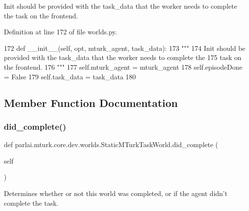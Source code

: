 \begin{DoxyVerb}Init should be provided with the task_data that the worker needs to complete the
task on the frontend.
\end{DoxyVerb}
 

Definition at line 172 of file worlds.\+py.


\begin{DoxyCode}
172     \textcolor{keyword}{def }\_\_init\_\_(self, opt, mturk\_agent, task\_data):
173         \textcolor{stringliteral}{"""}
174 \textcolor{stringliteral}{        Init should be provided with the task\_data that the worker needs to complete the}
175 \textcolor{stringliteral}{        task on the frontend.}
176 \textcolor{stringliteral}{        """}
177         self.mturk\_agent = mturk\_agent
178         self.episodeDone = \textcolor{keyword}{False}
179         self.task\_data = task\_data
180 
\end{DoxyCode}


\subsection{Member Function Documentation}
\mbox{\label{classparlai_1_1mturk_1_1core_1_1dev_1_1worlds_1_1StaticMTurkTaskWorld_a43d4e4711cd363ab8e018d856a4697e9}} 
\subsubsection{\texorpdfstring{did\+\_\+complete()}{did\_complete()}}
{\footnotesize\ttfamily def parlai.\+mturk.\+core.\+dev.\+worlds.\+Static\+M\+Turk\+Task\+World.\+did\+\_\+complete (\begin{DoxyParamCaption}\item[{}]{self }\end{DoxyParamCaption})}

\begin{DoxyVerb}Determines whether or not this world was completed, or if the agent didn't
complete the task.
\end{DoxyVerb}
 

